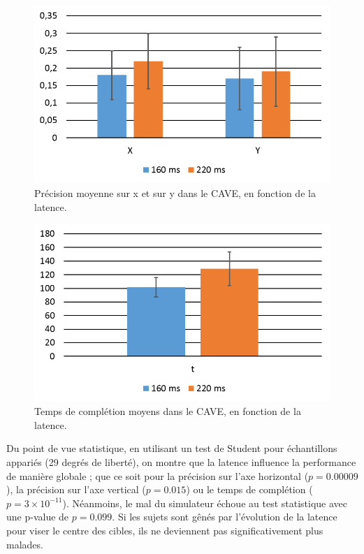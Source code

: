 	\begin{figure}[h]
		\centering
		\includegraphics[width=0.8\linewidth]{Figures/CavePrecisionResults.png}
		\caption{Précision moyenne sur x et sur y dans le CAVE, en fonction de la latence.}
		\label{fig:cave_precision}
	\end{figure}
	
	\begin{figure}[h]
		\centering
		\includegraphics[width=0.8\linewidth]{Figures/CaveCompletionTimeResults.png}
		\caption{Temps de complétion moyens dans le CAVE, en fonction de la latence.}
		\label{fig:cave_completion_time}
	\end{figure}
	
	\par Du point de vue statistique, en utilisant un test de Student pour échantillons appariés (29 degrés de liberté), on montre que la latence influence la performance de manière globale ; que ce soit pour la précision sur l'axe horizontal ($p = 0.00009$), la précision sur l'axe vertical ($p = 0.015$) ou le temps de complétion ($p = 3 \times 10^{-11}$). Néanmoins, le mal du simulateur échoue au test statistique avec une p-value de $p = 0.099$. Si les sujets sont gênés par l'évolution de la latence pour viser le centre des cibles, ils ne deviennent pas significativement plus malades.
	
